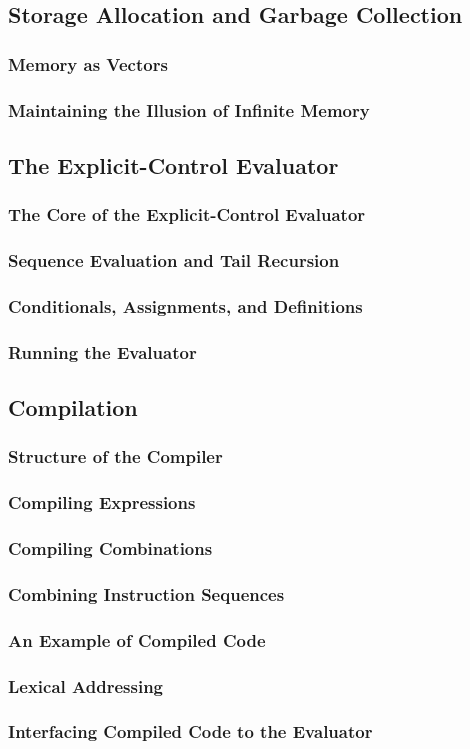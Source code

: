         \subsection{Storage Allocation and Garbage Collection}
            \subsubsection{Memory as Vectors}
            \subsubsection{Maintaining the Illusion of Infinite Memory}
        \subsection{The Explicit-Control Evaluator}
            \subsubsection{The Core of the Explicit-Control Evaluator}
            \subsubsection{Sequence Evaluation and Tail Recursion}
            \subsubsection{Conditionals, Assignments, and Definitions}
            \subsubsection{Running the Evaluator}
        \subsection{Compilation}
            \subsubsection{Structure of the Compiler}
            \subsubsection{Compiling Expressions}
            \subsubsection{Compiling Combinations}
            \subsubsection{Combining Instruction Sequences}
            \subsubsection{An Example of Compiled Code}
            \subsubsection{Lexical Addressing}
            \subsubsection{Interfacing Compiled Code to the Evaluator}

